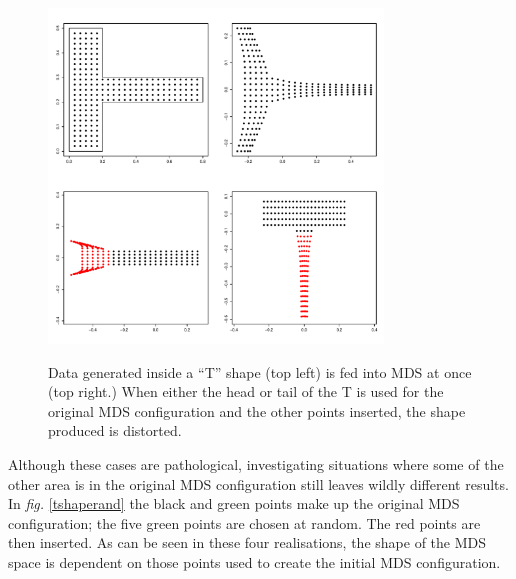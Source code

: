 \documentclass[a4paper,10pt]{article}
\newcommand{\fig}[1]{\emph{fig.} \ref{#1}}
\begin{document}
\begin{figure}
\centering
\includegraphics[width=3.5in]{figs/tshape.pdf} \\
\caption{Data generated inside a ``T'' shape (top left) is fed into MDS at once (top right.) When either the head or tail of the T is used for the original MDS configuration and the other points inserted, the shape produced is distorted.}
\label{tshape}
\end{figure}

Although these cases are pathological, investigating situations where some of the other area is in the original MDS configuration still leaves wildly different results. In \fig{tshaperand} the black and green points make up the original MDS configuration; the five green points are chosen at random. The red points are then inserted. As can be seen in these four realisations, the shape of the MDS space is dependent on those points used to create the initial MDS configuration.
\end{document}

